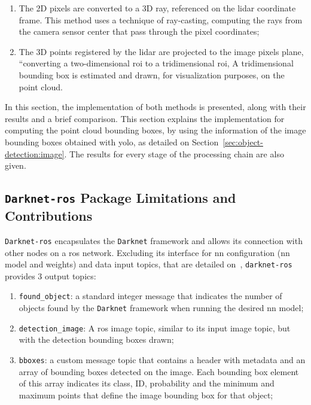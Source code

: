 \begin{enumerate}
	\item The 2D pixels are converted to a 3D ray, referenced on the \ac{lidar} coordinate frame. This method uses a technique of ray-casting, computing the rays from the camera sensor center that pass through the pixel coordinates;
	\item The 3D points registered by the \ac{lidar} are projected to the image pixels plane, ``converting a two-dimensional \ac{roi} to a tridimensional \ac{roi}, A tridimensional bounding box is estimated and drawn, for visualization purposes, on the point cloud. 
\end{enumerate}

In this section, the implementation of both methods is presented, along with their results and a brief comparison. This section explains the implementation for computing the point cloud bounding boxes, by using the information of the image bounding boxes obtained with \ac{yolo}, as detailed on Section~\ref{sec:object-detection:image}. The results for every stage of the processing chain are also given.


\subsection{\texttt{Darknet-ros} Package Limitations and Contributions}
\label{subsec:object-detection:darknet-contribution}
\texttt{Darknet-ros} encapsulates the \texttt{Darknet} framework and allows its connection with other nodes on a \ac{ros} network. Excluding its interface for \ac{nn} configuration (\ac{nn} model and weights) and data input topics, that are detailed on~\cite{MarkoBjelonic}, \texttt{darknet-ros} provides 3 output topics:

\begin{enumerate}
	\item \texttt{found\_object}: a standard integer message that indicates the number of objects found by the \texttt{Darknet} framework when running the desired \ac{nn} model;
	\item \texttt{detection\_image}: A \ac{ros} image topic, similar to its input image topic, but with the detection bounding boxes drawn;
	\item \texttt{bboxes}: a custom message topic that contains a header with metadata and an array of bounding boxes detected on the image. Each bounding box element of this array indicates its class, ID, probability and the minimum and maximum points that define the image bounding box for that object;
\end{enumerate}

